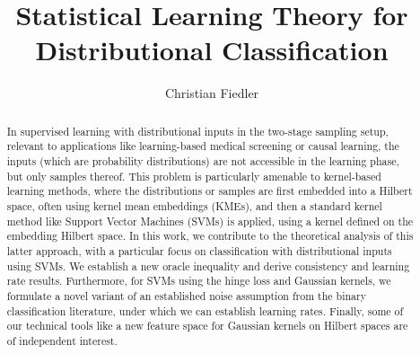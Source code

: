\documentclass[letterpaper]{article} %
\title{Statistical Learning Theory for Distributional Classification}
\author{
    Christian Fiedler
}
\begin{document}
\maketitle
\begin{abstract}
In supervised learning with distributional inputs in the two-stage sampling setup, relevant to applications like learning-based medical screening or causal learning, the inputs (which are probability distributions) are not accessible in the learning phase, but only samples thereof. This problem is particularly amenable to kernel-based learning methods, where the distributions or samples are first embedded into a Hilbert space, often using kernel mean embeddings (KMEs), and then a standard kernel method like Support Vector Machines (SVMs) is applied, using a kernel defined on the embedding Hilbert space. In this work, we contribute to the theoretical analysis of this latter approach, with a particular focus on classification with distributional inputs using SVMs. We establish a new oracle inequality and derive consistency and learning rate results. Furthermore, for SVMs using the hinge loss and Gaussian kernels, we formulate a novel variant of an established noise assumption from the binary classification literature, under which we can establish learning rates. Finally, some of our technical tools like a new feature space for Gaussian kernels on Hilbert spaces are of independent interest.
\end{abstract}
\end{document}
